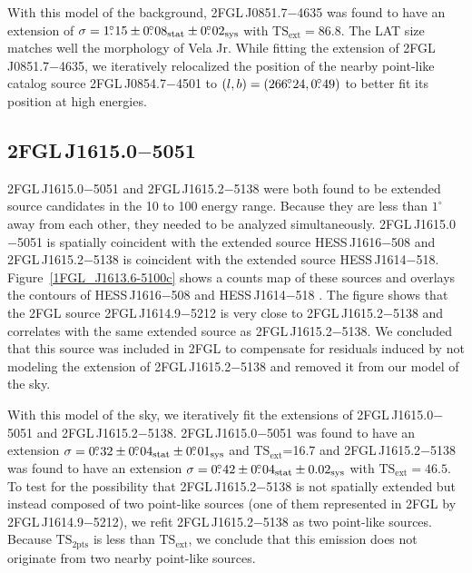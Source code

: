 \documentclass[12pt,preprint]{aastex}
\newcommand{\gev}{\text{GeV}\xspace}
\newcommand{\tev}{\text{TeV}\xspace}
\newcommand{\tsext}{{\ensuremath{\text{TS}_{\text{ext}}}}\xspace}
\newcommand{\tsinc}{\ensuremath{\text{TS}_{\text{2pts}}}\xspace}
\newcommand{\sys}{\text{sys}\xspace}
\newcommand{\stat}{\text{stat}\xspace}
\newcommand{\degree}{^\circ\xspace}
\begin{document}
With this model of the background, 2FGL\,J0851.7$-$4635 was found to
have an extension of $\sigma=1\fdg15\pm0\fdg08_\stat\pm0\fdg02_\sys$ with
$\tsext=86.8$.  The LAT size matches
well the \tev morphology of Vela Jr.  While fitting the extension
of 2FGL\,J0851.7$-$4635, we iteratively relocalized the position
of the nearby point-like catalog source 2FGL\,J0854.7$-$4501 to
$(l,b)=(266\mbox{$.\!\!^\circ$}24,0\mbox{$.\!\!^\circ$}49)$ to better fit its position at high energies.


\subsection{2FGL\,J1615.0$-$5051}
\label{section_2FGL_J1615.0-5051}


2FGL\,J1615.0$-$5051 and 2FGL\,J1615.2$-$5138 were both found to be
extended source candidates in the 10 \gev to 100 \gev energy range. Because
they are less than $1\degree$ away from each other, they needed to be analyzed
simultaneously.  2FGL\,J1615.0$-$5051 is spatially coincident with
the extended \tev source HESS\,J1616$-$508 and 2FGL\,J1615.2$-$5138
is coincident with the extended \tev source HESS\,J1614$-$518.
Figure~\ref{1FGL_J1613.6-5100c} shows a counts map of these sources and
overlays the \tev contours of HESS\,J1616$-$508 and HESS\,J1614$-$518
\citep{hess_plane_survey}.  The figure shows that the 2FGL source
2FGL\,J1614.9$-$5212 is very close to 2FGL\,J1615.2$-$5138 and correlates
with the same extended \tev source as 2FGL\,J1615.2$-$5138.  We concluded
that this source was included in 2FGL to compensate for residuals induced
by not modeling the extension of 2FGL\,J1615.2$-$5138 and removed
it from our model of the sky.  

With this model of the sky, we iteratively fit the extensions of
2FGL\,J1615.0$-$5051 and 2FGL\,J1615.2$-$5138.
2FGL\,J1615.0$-$5051 was found to have an extension 
$\sigma=0\fdg32\pm0\fdg04_\stat\pm0\fdg01_\sys$ and
\tsext=16.7 and
2FGL\,J1615.2$-$5138 was found
 to have an extension $\sigma=0\fdg42\pm0\fdg04_\stat\pm0.02_\sys$
with $\tsext=46.5$.
To test for the possibility that
2FGL\,J1615.2$-$5138 is not spatially extended but instead composed
of two point-like sources (one of them represented in 2FGL by
2FGL\,J1614.9$-$5212), we refit 2FGL\,J1615.2$-$5138 as two point-like
sources.  Because \tsinc is less than \tsext, we conclude that
this emission does not originate from two nearby point-like sources.
\end{document}
